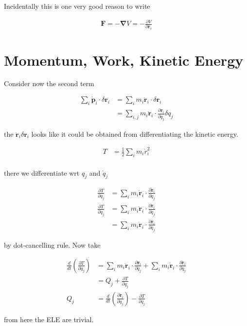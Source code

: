 \documentclass{article}
\newcommand{\mb}{\mathbf}
\begin{document}
Incidentally this is one very good reason to write

\begin{align}
\mb{F} = -\mb{\nabla}V = -\frac{\partial V}{\partial \mb{r}_i}
\end{align}

\section{Momentum, Work, Kinetic Energy}

Consider now the second term

\begin{align}
\sum_i \mb{\dot{p}}_i \cdot \delta \mb{r}_i &= \sum_i m_i\mb{\ddot{r}}_i \cdot \delta \mb{r}_i \\
&= \sum_{i,j} m_i\mb{\ddot{r}}_i \cdot \frac{\partial \mb{r}_i}{\partial q_j} \delta q_j
\end{align}

the $\mb{\ddot{r}}_i \delta \mb{r}_i$ looks like it could be obtained from differentiating the kinetic energy.

\begin{align}
T &= \frac{1}{2}\sum_i m_i\dot{r}_i^2 \\
\end{align}

there we differentiate wrt $q_j$ and $\dot{q}_j$

\begin{align}
\frac{\partial T}{\partial q_j} &= \sum_i m_i\mb{\dot{r}}_i \cdot \frac{\partial \mb{\dot{r}}_i}{\partial q_j} \\
\frac{\partial T}{\partial \dot{q}_j} &= \sum_i m_i\mb{\dot{r}}_i \cdot \frac{\partial \mb{\dot{r}}_i}{\partial \dot{q}_j} \\
&= \sum_i m_i\mb{\dot{r}}_i \cdot \frac{\partial \mb{r}_i}{\partial q_j}
\end{align}

by dot-cancelling rule. Now take

\begin{align}
\frac{d}{dt} \left(\frac{\partial T}{\partial \dot{q}_j}\right) &= \sum_i m_i\mb{\ddot{r}}_i \cdot \frac{\partial \mb{r}_i}{\partial q_j} + \sum_i m_i\mb{\dot{r}}_i \cdot \frac{\partial \mb{\dot{r}}_i}{\partial q_j} \\
&= Q_j + \frac{\partial T}{\partial q_j} \\
Q_j &= \frac{d}{dt} \left(\frac{\partial \mb{\dot{r}}_i}{\partial \dot{q}_j}\right) - \frac{\partial T}{\partial q_j}
\end{align}

from here the ELE are trivial.
\end{document}
